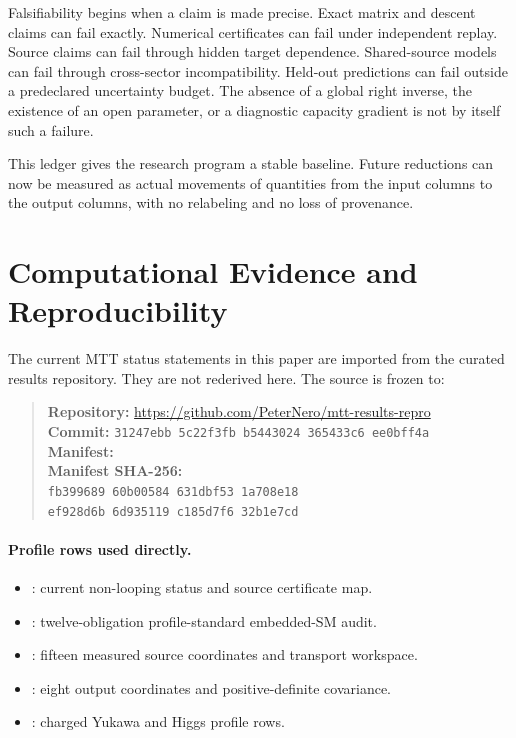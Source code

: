 \documentclass[11pt]{article}
\begin{document}
Falsifiability begins when a claim is made precise. Exact matrix and descent
claims can fail exactly. Numerical certificates can fail under independent
replay. Source claims can fail through hidden target dependence. Shared-source
models can fail through cross-sector incompatibility. Held-out predictions
can fail outside a predeclared uncertainty budget. The absence of a global
right inverse, the existence of an open parameter, or a diagnostic capacity
gradient is not by itself such a failure.

This ledger gives the research program a stable baseline. Future reductions
can now be measured as actual movements of quantities from the input columns
to the output columns, with no relabeling and no loss of provenance.

\section*{Computational Evidence and Reproducibility}

The current MTT status statements in this paper are imported from the curated
results repository. They are not rederived here. The source is frozen to:
\begin{quote}\small
\textbf{Repository:}
\url{https://github.com/PeterNero/mtt-results-repro}\\
\textbf{Commit:}
\texttt{31247ebb 5c22f3fb b5443024 365433c6 ee0bff4a}\\
\textbf{Manifest:} \\
\textbf{Manifest SHA-256:}\\
\texttt{fb399689 60b00584 631dbf53 1a708e18}\\
\texttt{ef928d6b 6d935119 c185d7f6 32b1e7cd}
\end{quote}

\paragraph{Profile rows used directly.}
\begin{itemize}
\item {}: current non-looping status and source
certificate map.
\item {}: twelve-obligation profile-standard
embedded-SM audit.
\item {}: fifteen measured source
coordinates and transport workspace.
\item {}: eight output coordinates and
positive-definite covariance.
\item {}: charged Yukawa and Higgs
profile rows.
\end{itemize}
\end{document}
